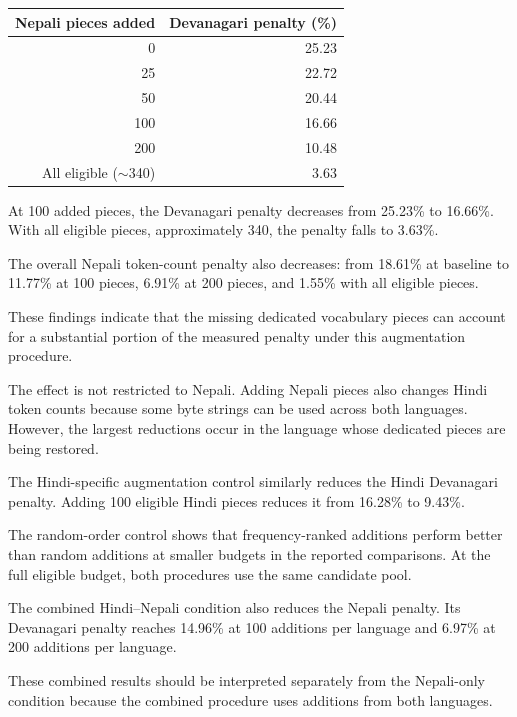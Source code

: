 \documentclass[10pt,twocolumn]{article}
\begin{document}
\begin{center}
\small
\begin{tabular}{@{}rr@{}}
\toprule
Nepali pieces added & Devanagari penalty (\%) \\
\midrule
0 & 25.23 \\
25 & 22.72 \\
50 & 20.44 \\
100 & 16.66 \\
200 & 10.48 \\
All eligible ($\sim$340) & 3.63 \\
\bottomrule
\end{tabular}

\label{tab:augmentation}
\end{center}

At 100 added pieces, the Devanagari penalty decreases
from 25.23\% to 16.66\%. With all eligible pieces,
approximately 340, the penalty falls to 3.63\%.

The overall Nepali token-count penalty also decreases:
from 18.61\% at baseline to 11.77\% at 100 pieces,
6.91\% at 200 pieces, and 1.55\% with all eligible pieces.

These findings indicate that the missing dedicated
vocabulary pieces can account for a substantial portion
of the measured penalty under this augmentation procedure.

The effect is not restricted to Nepali. Adding Nepali
pieces also changes Hindi token counts because some
byte strings can be used across both languages.
However, the largest reductions occur in the language
whose dedicated pieces are being restored.

The Hindi-specific augmentation control similarly
reduces the Hindi Devanagari penalty. Adding 100
eligible Hindi pieces reduces it from 16.28\% to 9.43\%.

The random-order control shows that frequency-ranked
additions perform better than random additions at
smaller budgets in the reported comparisons. At the
full eligible budget, both procedures use the same
candidate pool.

The combined Hindi--Nepali condition also reduces
the Nepali penalty. Its Devanagari penalty reaches
14.96\% at 100 additions per language and 6.97\%
at 200 additions per language.

These combined results should be interpreted separately
from the Nepali-only condition because the combined
procedure uses additions from both languages.
\end{document}
